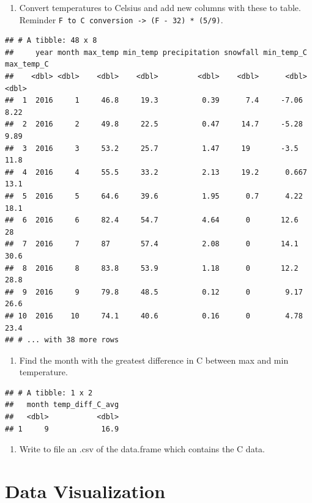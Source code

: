 \documentclass[
]{book}
\providecommand{\tightlist}{%
  \setlength{\itemsep}{0pt}\setlength{\parskip}{0pt}}
\begin{document}
\begin{enumerate}
\def\labelenumi{\arabic{enumi}.}
\setcounter{enumi}{6}
\tightlist
\item
  Convert temperatures to Celsius and add new columns with these to table. Reminder \texttt{F\ to\ C\ conversion\ -\textgreater{}\ (F\ -\ 32)\ *\ (5/9)}.
\end{enumerate}

\begin{verbatim}
## # A tibble: 48 x 8
##     year month max_temp min_temp precipitation snowfall min_temp_C max_temp_C
##    <dbl> <dbl>    <dbl>    <dbl>         <dbl>    <dbl>      <dbl>      <dbl>
##  1  2016     1     46.8     19.3          0.39      7.4     -7.06        8.22
##  2  2016     2     49.8     22.5          0.47     14.7     -5.28        9.89
##  3  2016     3     53.2     25.7          1.47     19       -3.5        11.8 
##  4  2016     4     55.5     33.2          2.13     19.2      0.667      13.1 
##  5  2016     5     64.6     39.6          1.95      0.7      4.22       18.1 
##  6  2016     6     82.4     54.7          4.64      0       12.6        28   
##  7  2016     7     87       57.4          2.08      0       14.1        30.6 
##  8  2016     8     83.8     53.9          1.18      0       12.2        28.8 
##  9  2016     9     79.8     48.5          0.12      0        9.17       26.6 
## 10  2016    10     74.1     40.6          0.16      0        4.78       23.4 
## # ... with 38 more rows
\end{verbatim}

\begin{enumerate}
\def\labelenumi{\arabic{enumi}.}
\setcounter{enumi}{7}
\tightlist
\item
  Find the month with the greatest difference in C between max and min temperature.
\end{enumerate}

\begin{verbatim}
## # A tibble: 1 x 2
##   month temp_diff_C_avg
##   <dbl>           <dbl>
## 1     9            16.9
\end{verbatim}

\begin{enumerate}
\def\labelenumi{\arabic{enumi}.}
\setcounter{enumi}{8}
\tightlist
\item
  Write to file an .csv of the data.frame which contains the C data.
\end{enumerate}

\hypertarget{data-visualization}{%
\chapter{Data Visualization}\label{data-visualization}}
\end{document}
